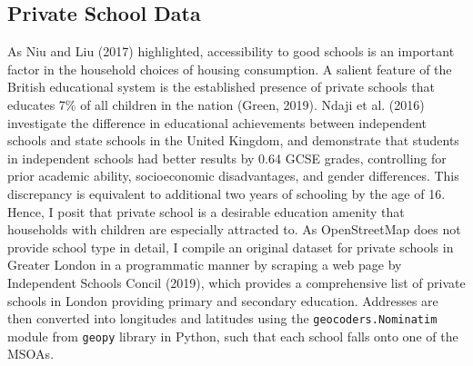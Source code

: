 \documentclass{article}
\begin{document}
\subsection{Private School Data} \label{subsection:school}
As Niu and Liu (2017) highlighted, accessibility to good schools is an important factor in the household choices of housing consumption. A salient feature of the British educational system is the established presence of private schools that educates 7\% of all children in the nation (Green, 2019). Ndaji et al. (2016) investigate the difference in educational achievements between independent schools and state schools in the United Kingdom, and demonstrate that students in independent schools had better results by 0.64 GCSE grades, controlling for prior academic ability, socioeconomic disadvantages, and gender differences. This discrepancy is equivalent to additional two years of schooling by the age of 16. Hence, I posit that private school is a desirable education amenity that households with children are especially attracted to. As OpenStreetMap does not provide school type in detail, I compile an original dataset for private schools in Greater London in a programmatic manner by scraping a web page by Independent Schools Concil (2019), which provides a comprehensive list of private schools in London providing primary and secondary education. Addresses are then converted into longitudes and latitudes using the \texttt{geocoders.Nominatim} module from \texttt{geopy} library in Python, such that each school falls onto one of the MSOAs.
\end{document}
